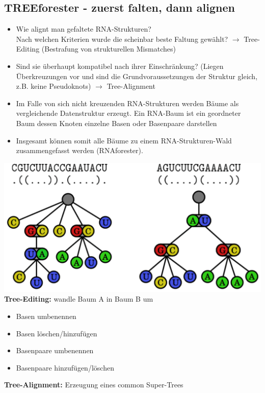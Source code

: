\subsection{TREEforester - zuerst falten, dann alignen}
\begin{itemize}
\item Wie alignt man gefaltete RNA-Strukturen? \\
Nach welchen Kriterien wurde die scheinbar beste Faltung gewählt? $\rightarrow$ Tree-Editing (Bestrafung von strukturellen Mismatches)
\item Sind sie überhaupt kompatibel nach ihrer Einschränkung? (Liegen Überkreuzungen vor und sind die Grundvoraussetzungen der Struktur gleich, z.B. keine Pseudoknots) $\rightarrow$ Tree-Alignment
\item Im Falle von sich nicht kreuzenden RNA-Strukturen werden Bäume als vergleichende Datenstruktur erzeugt. Ein RNA-Baum ist ein geordneter Baum dessen Knoten einzelne Basen oder Basenpaare darstellen
\item Insgesamt können somit alle Bäume zu einem RNA-Strukturen-Wald zusammengefasst werden (RNAforester). \\
\end{itemize}
\includegraphics[scale=0.5]{lectures/160509/pix/Baeume.pdf} \\

\textbf{Tree-Editing:} wandle Baum A in Baum B um
\begin{itemize}
\item Basen umbenennen
\item Basen löschen/hinzufügen
\item Basenpaare umbenennen
\item Basenpaare hinzufügen/löschen
\end{itemize}

\textbf{Tree-Alignment:} Erzeugung eines common Super-Trees



